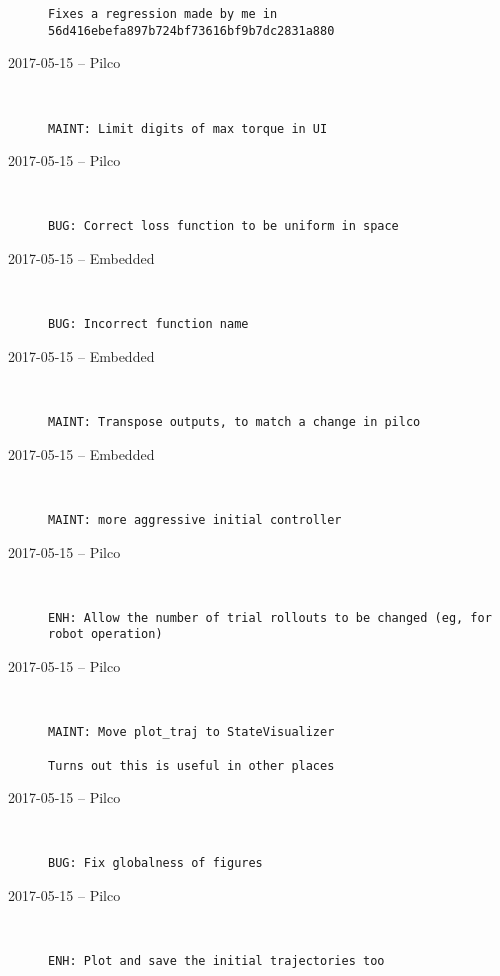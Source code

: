 \begin{description}
\begin{lstlisting}
Fixes a regression made by me in 56d416ebefa897b724bf73616bf9b7dc2831a880
\end{lstlisting}


  \item[2017-05-15 -- Pilco] \hfill \
\begin{lstlisting}
MAINT: Limit digits of max torque in UI
\end{lstlisting}


  \item[2017-05-15 -- Pilco] \hfill \
\begin{lstlisting}
BUG: Correct loss function to be uniform in space
\end{lstlisting}


  \item[2017-05-15 -- Embedded] \hfill \
\begin{lstlisting}
BUG: Incorrect function name
\end{lstlisting}


  \item[2017-05-15 -- Embedded] \hfill \
\begin{lstlisting}
MAINT: Transpose outputs, to match a change in pilco
\end{lstlisting}


  \item[2017-05-15 -- Embedded] \hfill \
\begin{lstlisting}
MAINT: more aggressive initial controller
\end{lstlisting}


  \item[2017-05-15 -- Pilco] \hfill \
\begin{lstlisting}
ENH: Allow the number of trial rollouts to be changed (eg, for robot operation)
\end{lstlisting}


  \item[2017-05-15 -- Pilco] \hfill \
\begin{lstlisting}
MAINT: Move plot_traj to StateVisualizer

Turns out this is useful in other places
\end{lstlisting}


  \item[2017-05-15 -- Pilco] \hfill \
\begin{lstlisting}
BUG: Fix globalness of figures
\end{lstlisting}


  \item[2017-05-15 -- Pilco] \hfill \
\begin{lstlisting}
ENH: Plot and save the initial trajectories too
\end{lstlisting}



\end{description}
